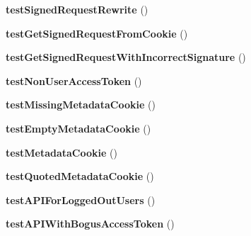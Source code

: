 \begin{DoxyCompactItemize}
\item 
\hypertarget{class_p_h_p_s_d_k_test_case_a77506181f6eb15755e2e1d1ab08e5894}{{\bfseries test\-Signed\-Request\-Rewrite} ()}\label{class_p_h_p_s_d_k_test_case_a77506181f6eb15755e2e1d1ab08e5894}

\item 
\hypertarget{class_p_h_p_s_d_k_test_case_ac940fafad09f95769f7b3f61bc842d6f}{{\bfseries test\-Get\-Signed\-Request\-From\-Cookie} ()}\label{class_p_h_p_s_d_k_test_case_ac940fafad09f95769f7b3f61bc842d6f}

\item 
\hypertarget{class_p_h_p_s_d_k_test_case_ab463906866168587ccb04c69a512e7c0}{{\bfseries test\-Get\-Signed\-Request\-With\-Incorrect\-Signature} ()}\label{class_p_h_p_s_d_k_test_case_ab463906866168587ccb04c69a512e7c0}

\item 
\hypertarget{class_p_h_p_s_d_k_test_case_a54c91f92ab080daac514c793dbe60271}{{\bfseries test\-Non\-User\-Access\-Token} ()}\label{class_p_h_p_s_d_k_test_case_a54c91f92ab080daac514c793dbe60271}

\item 
\hypertarget{class_p_h_p_s_d_k_test_case_acf404a1e287059ddbf3ccd968c9d017a}{{\bfseries test\-Missing\-Metadata\-Cookie} ()}\label{class_p_h_p_s_d_k_test_case_acf404a1e287059ddbf3ccd968c9d017a}

\item 
\hypertarget{class_p_h_p_s_d_k_test_case_a0303b4b16fd6ecf0bd5d00091434b1f0}{{\bfseries test\-Empty\-Metadata\-Cookie} ()}\label{class_p_h_p_s_d_k_test_case_a0303b4b16fd6ecf0bd5d00091434b1f0}

\item 
\hypertarget{class_p_h_p_s_d_k_test_case_a02a8be4bca891e1289a063393c023755}{{\bfseries test\-Metadata\-Cookie} ()}\label{class_p_h_p_s_d_k_test_case_a02a8be4bca891e1289a063393c023755}

\item 
\hypertarget{class_p_h_p_s_d_k_test_case_a08255f09353185654f53962a0eab4b9c}{{\bfseries test\-Quoted\-Metadata\-Cookie} ()}\label{class_p_h_p_s_d_k_test_case_a08255f09353185654f53962a0eab4b9c}

\item 
\hypertarget{class_p_h_p_s_d_k_test_case_a77f5242d8822d0a52375872cbb8471db}{{\bfseries test\-A\-P\-I\-For\-Logged\-Out\-Users} ()}\label{class_p_h_p_s_d_k_test_case_a77f5242d8822d0a52375872cbb8471db}

\item 
\hypertarget{class_p_h_p_s_d_k_test_case_a8ef95dc2a2175d57a52b4b7a5c90fe8d}{{\bfseries test\-A\-P\-I\-With\-Bogus\-Access\-Token} ()}\label{class_p_h_p_s_d_k_test_case_a8ef95dc2a2175d57a52b4b7a5c90fe8d}


\end{DoxyCompactItemize}
